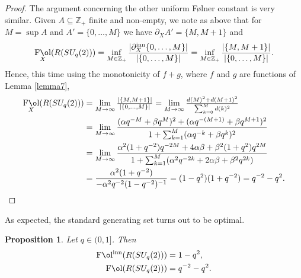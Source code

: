 \documentclass[11 pt, leqno]{amsart}
\newcommand{\ZZ}{\mathbb{Z}}
\DeclareMathOperator{\Fol}{F\mathrm{\o}l}
\DeclareMathOperator{\Folinn}{F\mathrm{\o}l^{inn}}
\DeclareMathOperator{\inn}{inn}
\newtheorem{proposition}[theorem]{Proposition}
\theoremstyle{definition}
\numberwithin{equation}{section}
\begin{document}
\begin{proof}
The argument concerning the other uniform F\o lner constant is very similar. Given $A\subseteq \ZZ_+$  finite and non-empty, we note as above that for $M=\sup A$ and $A'=\{0,\dotsc ,M\}$ we have $\partial_X A'=
	\{M, M+1\}$ and 
	\[
	\Fol_X(R(SU_q(2)))=\inf_{M\in \ZZ_+} \frac{ |\partial_X^{\inn} \{0,\dotsc, M\}|}{|\{0,\dotsc, M\}|}=\inf_{M\in \ZZ_+} \frac{ |\{M, M+1\}|}{|\{0,\dotsc, M\}|}.
	\]
Hence, this time using the monotonicity of $f+g$, where $f$ and $g$ are functions of Lemma \ref{lemma7}, 
	\begin{align*}
	\Fol_X(R(SU_q(2)))&=
	\lim_{M\to\infty}
	\tfrac{|\{M, M+1\}|}{|\{0,\dotsc, M\}|}=
	\lim_{M\to\infty}
	\tfrac{d(M)^2 +d(M+1)^2}{\sum_{k=0}^{M} d(k)^2} \\&=
	\lim_{M\to\infty} \frac{(\alpha q^{-M} + \beta q^{M})^2 + (\alpha q^{-(M+1)} + \beta q^{M+1})^2}
	{1+ \sum_{k=1}^{M} (\alpha q^{-k}+ \beta q^k )^2 }
	\\
	&=
	\lim_{M\to\infty} \frac{\alpha^2(1 +q^{-2}) q^{-2M} + 4\alpha \beta  + \beta^2(1+q^2) q^{2M} 
	}
	{1 + \sum_{k=1}^{M}( \alpha^2 q^{-2k} +2\alpha \beta  +\beta^2 q^{2k} )}\\
	&= \frac{\alpha^2 (1+q^{-2})}
	{-\alpha^2 q^{-2}(1-q^{-2})^{-1}
	} =(1-q^2)(1+q^{-2}) = q^{-2} - q^{2}.
	\end{align*}
\end{proof}


As expected, the standard generating set turns out to be optimal.

\begin{proposition}\label{prop12}
Let $q\in (0,1]$. Then 
\[\begin{split}
\Folinn(R(SU_q(2)))&=1-q^{2}, \\
\Fol(R(SU_q(2)))&=q^{-2} - q^{2}.
\end{split}\]
\end{proposition}
\end{document}
